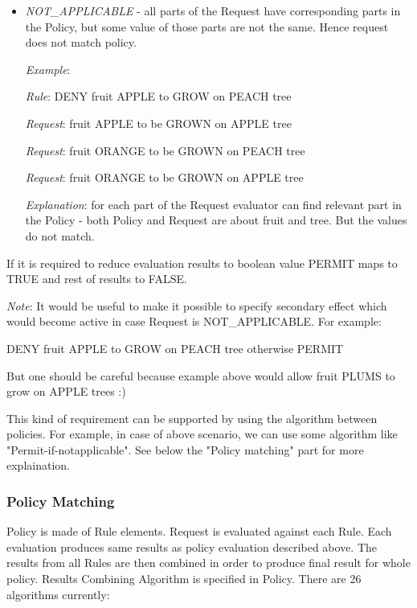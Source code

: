 \documentclass{article}                            %
\begin{document}
\begin{itemize}
    \item  \emph{NOT\_APPLICABLE} - all parts of the Request have corresponding parts in the Policy, but some value of those parts are not the same. Hence request does not match policy.

        \emph{Example}:

            \emph{Rule}: DENY fruit APPLE to GROW on PEACH tree

            \emph{Request}: fruit APPLE to be GROWN on APPLE tree

            \emph{Request}: fruit ORANGE to be GROWN on PEACH tree

            \emph{Request}: fruit ORANGE to be GROWN on APPLE tree

        \emph{Explanation}: for each part of the Request evaluator can find relevant part in the Policy - both Policy and Request are about fruit and tree. But the values do not match.

\end{itemize}

If it is required to reduce evaluation results to boolean value PERMIT maps to TRUE and rest of results to FALSE.

\emph{Note}: It would be useful to make it possible to specify secondary effect which would become active in case Request is NOT\_APPLICABLE. For example:

DENY fruit APPLE to GROW on PEACH tree otherwise PERMIT

But one should be careful because example above would allow fruit PLUMS to grow on APPLE trees :)

This kind of requirement can be supported by using the algorithm between policies.  For example, in case of above scenario, we can use some algorithm like "Permit-if-notapplicable". See below the "Policy matching" part for more explaination.


\subsubsection{Policy Matching} %
\label{subsubsec:poicy_matching}
Policy is made of Rule elements. Request is evaluated against each Rule. Each evaluation produces same results as policy evaluation described above. The results from all Rules are then combined in order to produce final result for whole policy. Results Combining Algorithm is specified in Policy. There are 26 algorithms currently:
\end{document}

